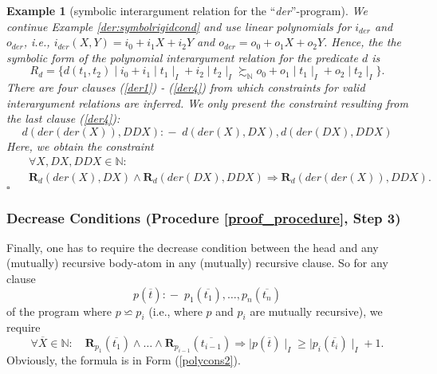\documentclass[envcountsame]{tlp}
\newcommand{\incase}{:\!\!-\;}
\newcounter{polycons2ctr}
\newcounter{polycons1ctr}
\newcounter{ex:der-lastsymconsctr}
\newtheorem{example}{Example}
\begin{document}
\begin{example}[symbolic interargument relation for the 
``\textit{der}''-program]
\label{symbolic-der}
 We continue Example \ref{der:symbolrigidcond} and
use linear polynomials for 
$i_{\mathit{der}}$ and 
$o_{\mathit{der}}$, i.e., $i_{\mathit{der}}(X,Y) = i_0 + i_1 X+ i_2 Y$ and
$o_{\mathit{der}} = o_0+ o_1 X+ o_2 Y$. Hence, the 
the symbolic form of the polynomial interargument relation for the predicate  $d$ is
\begin{equation*}
    R_{d} = \{d(t_1,t_2) \mid i_0 + i_1{\mid}t_1{\mid}_I
+i_2{\mid}t_2{\mid}_I \succsim_\mathbb{N} o_0 +
o_1{\mid}t_1{\mid}_I +
o_2{\mid}t_2{\mid}_I\}. 
\end{equation*}
There are four clauses (\ref{der1}) -
(\ref{der4}) from which constraints for 
valid interargument relations are inferred. We only present the constraint
resulting from the last clause
(\ref{der4}):
\[d(\mathit{der}(\mathit{der}(X)),\mathit{DDX}) \incase 
d(\mathit{der}(X),\mathit{DX}), d(\mathit{der}(\mathit{DX}),\mathit{DDX})\]
Here, we obtain the constraint
\begin{eqnarray}
\nonumber && \forall X, \mathit{DX}, \mathit{DDX} \in
\mathbb{N}:\\
&&\mathbf{R}_{d}(\mathit{der}(X),\mathit{DX}) \wedge 
\mathbf{R}_{d}(\mathit{der}(\mathit{DX}),\mathit{DDX})  \Rightarrow 
\mathbf{R}_{d}(\mathit{der}(\mathit{der}(X)),\mathit{DDX}). \label{IAConstraint}
\end{eqnarray}
{\hfill{$\square$}}		
\end{example}



\subsubsection{Decrease Conditions (Procedure \ref{proof_procedure}, Step
3)}\label{Decrease Conditions}\hspace*{\fill} 

\vspace*{.2cm}

\noindent
Finally, one has to require the decrease condition between the head and any
(mutually) recursive body-atom in any (mutually) recursive clause.
So for any clause 
\[p(\overline{t}) \incase p_1(\overline{t_1}), \ldots,
p_n(\overline{t_n})\]
of the program where 
$p \backsimeq p_i$ (i.e., where $p$ and $p_i$ are mutually recursive),
we require
\[   \forall \overline{X} \in \mathbb{N}: \quad 
\mathbf{R}_{p_1}(\overline{t_1}) \wedge \ldots \wedge
\mathbf{R}_{p_{i-1}}(\overline{t_{i-1}}) \Rightarrow
{\mid}p(\overline{t}){\mid}_I \geq {\mid}p_i(\overline{t_i}){\mid}_I +1.\]
Obviously, 
the formula is in Form 
(\ref{polycons2}). 
\end{document}
